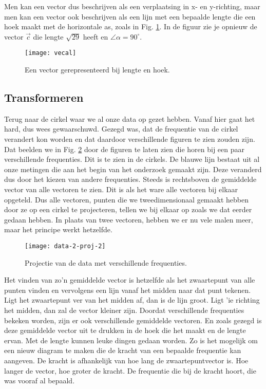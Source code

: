 \documentclass[11pt,fleqn]{book} %
\begin{document}
Men kan een vector dus beschrijven als een verplaatsing in x- en y-richting, maar men kan een vector ook beschrijven als een lijn met een bepaalde lengte die een hoek maakt met de horizontale as, zoals in Fig. \ref{fig:vecal}. In de figuur zie je opnieuw de vector $\vec{c}$ die lengte $\sqrt{29}$ heeft en $\angle \alpha = 90^\circ$.

\begin{figure}[h]
	\centering\texttt{[image: vecal]}
	\caption{Een vector gerepresenteerd bij lengte en hoek.}
	\label{fig:vecal}
\end{figure}

\subsection{Transformeren}
Terug naar de cirkel waar we al onze data op gezet hebben. Vanaf hier gaat het hard, dus wees gewaarschuwd. Gezegd was, dat de frequentie van de cirkel verandert kon worden en dat daardoor verschillende figuren te zien zouden zijn. Dat beelden we in Fig. \ref{fig:data-2-proj-2} door de figuren te laten zien die horen bij een paar verschillende frequenties. Dit is te zien in de cirkels. De blauwe lijn bestaat uit al onze metingen die aan het begin van het onderzoek gemaakt zijn. Deze veranderd dus door het kiezen van andere frequenties. Steeds is rechtsboven de gemiddelde vector van alle vectoren te zien. Dit is als het ware alle vectoren bij elkaar opgeteld. Dus alle vectoren, punten die we tweedimensionaal gemaakt hebben door ze op een cirkel te projecteren, tellen we bij elkaar op zoals we dat eerder gedaan hebben. In plaats van twee vectoren, hebben we er nu vele malen meer, maar het principe werkt hetzelfde.

\begin{figure}[h]
	\centering\texttt{[image: data-2-proj-2]}
	\caption{Projectie van de data met verschillende frequenties.}
	\label{fig:data-2-proj-2}
\end{figure}

Het vinden van zo’n gemiddelde vector is hetzelfde als het zwaartepunt van alle punten vinden en vervolgens een lijn vanaf het midden naar dat punt tekenen. Ligt het zwaartepunt ver van het midden af, dan is de lijn groot. Ligt 'ie richting het midden, dan zal de vector kleiner zijn. Doordat verschillende frequenties bekeken worden, zijn er ook verschillende gemiddelde vectoren. En zoals gezegd is deze gemiddelde vector uit te drukken in de hoek die het maakt en de lengte ervan. Met de lengte kunnen leuke dingen gedaan worden. Zo is het mogelijk om een nieuw diagram te maken die de kracht van een bepaalde frequentie kan aangeven. De kracht is afhankelijk van hoe lang de zwaartepuntvector is. Hoe langer de vector, hoe groter de kracht. De frequentie die bij de kracht hoort, die was vooraf al bepaald.
\end{document}
